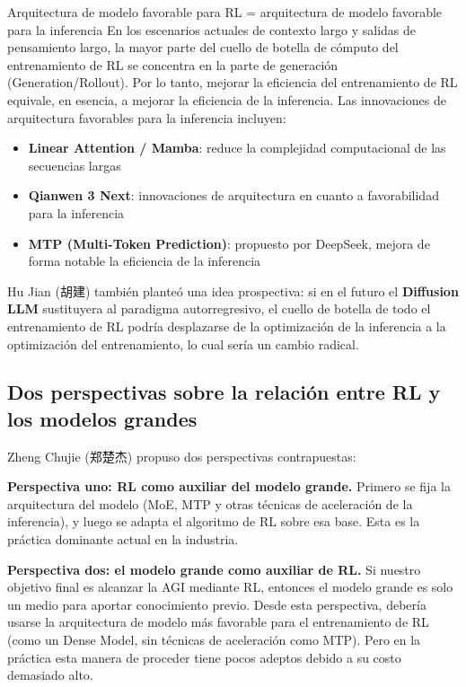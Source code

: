 \begin{importantbox}{Arquitectura de modelo favorable para RL = arquitectura de modelo favorable para la inferencia}
En los escenarios actuales de contexto largo y salidas de pensamiento largo, la mayor parte del cuello de botella de cómputo del entrenamiento de RL se concentra en la parte de generación (Generation/Rollout). Por lo tanto, mejorar la eficiencia del entrenamiento de RL equivale, en esencia, a mejorar la eficiencia de la inferencia. Las innovaciones de arquitectura favorables para la inferencia incluyen:
\begin{itemize}
    \item \textbf{Linear Attention / Mamba}: reduce la complejidad computacional de las secuencias largas
    \item \textbf{Qianwen 3 Next}: innovaciones de arquitectura en cuanto a favorabilidad para la inferencia
    \item \textbf{MTP (Multi-Token Prediction)}: propuesto por DeepSeek, mejora de forma notable la eficiencia de la inferencia
\end{itemize}
\end{importantbox}

Hu Jian (胡建) también planteó una idea prospectiva: si en el futuro el \textbf{Diffusion LLM} sustituyera al paradigma autorregresivo, el cuello de botella de todo el entrenamiento de RL podría desplazarse de la optimización de la inferencia a la optimización del entrenamiento, lo cual sería un cambio radical.

\subsection{Dos perspectivas sobre la relación entre RL y los modelos grandes}

Zheng Chujie (郑楚杰) propuso dos perspectivas contrapuestas:

\textbf{Perspectiva uno: RL como auxiliar del modelo grande.} Primero se fija la arquitectura del modelo (MoE, MTP y otras técnicas de aceleración de la inferencia), y luego se adapta el algoritmo de RL sobre esa base. Esta es la práctica dominante actual en la industria.

\textbf{Perspectiva dos: el modelo grande como auxiliar de RL.} Si nuestro objetivo final es alcanzar la AGI mediante RL, entonces el modelo grande es solo un medio para aportar conocimiento previo. Desde esta perspectiva, debería usarse la arquitectura de modelo más favorable para el entrenamiento de RL (como un Dense Model, sin técnicas de aceleración como MTP). Pero en la práctica esta manera de proceder tiene pocos adeptos debido a su costo demasiado alto.

